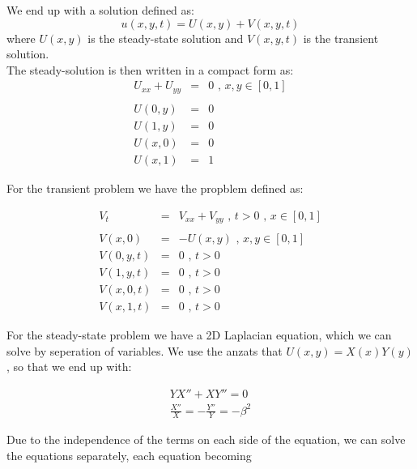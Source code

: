 \documentclass{article}
\begin{document}
We end up with a solution defined as:
\begin{equation}
u(x,y,t) = U(x,y) + V(x,y,t)
\end{equation}
where $U(x,y)$ is the steady-state solution and $V(x,y,t)$ is the transient solution.\\

The steady-solution is then written in a compact form as:
\begin{subequations}
	\begin{eqnarray}
	U_{xx} + U_{yy} &=& 0 \textit{ , } x,y \in [0,1]\\ \nonumber
	\\
	U(0,y) &=& 0 \textit{  } \\
	U(1,y) &=& 0 \textit{  } \\
	U(x,0) &=& 0 \textit{  } \\
	U(x,1) &=& 1 \textit{  } 
	\end{eqnarray}
\end{subequations}

For the transient problem we have the propblem defined as:

\begin{subequations}
	\begin{eqnarray}
	\label{eqn:transientPDE}
	V_t &=& V_{xx} + V_{yy} \textit{ , } t>0 \textit{ , } x \in [0,1] \\ \nonumber
	\\
	\label{eqn:transientICPDE}
	V(x,0) &=& -U(x,y) \textit{ , } x,y \in [0,1] \\
	V(0,y,t) &=& 0 \textit{ , } t>0 \\
	V(1,y,t) &=& 0 \textit{ , } t>0 \\
	V(x,0,t) &=& 0 \textit{ , } t>0 \\
	V(x,1,t) &=& 0 \textit{ , } t>0 
	\end{eqnarray}
\end{subequations}

For the steady-state problem we have a 2D Laplacian equation, which we can solve by seperation of variables. We use the anzats that $U(x,y) = X(x)Y(y)$, so that we end up with:

\begin{eqnarray}
\nonumber
YX'' + XY''=0 \\ \nonumber
\frac{X''}{X} = - \frac{Y''}{Y} = -\beta^2
\end{eqnarray}

Due to the independence of the terms on each side of the equation, we can solve the equations separately, each equation becoming
\end{document}
